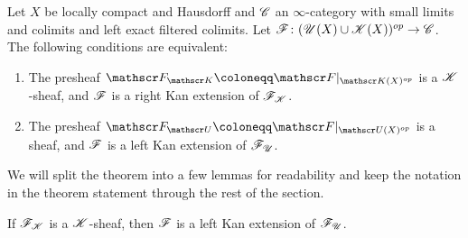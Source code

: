 \documentclass[../../thesis.tex]{subfiles}
\begin{document}
\begin{theorem}\label{7.3.4.9}
    Let $X$ be locally compact and Hausdorff and $\mathscr{C}$ an $\infty$-category  with small limits and colimits and left exact filtered colimits.
    Let $\mathscr{F} \colon (\mathscr{U}(X) \cup \mathscr{K}(X))^{op} \to \mathscr{C}$.
    The following conditions are equivalent:
    \begin{enumerate}[]
        \item The presheaf $\F_{\K}\coloneqq \F|_{\K(X)^{op}}$ is a $\mathscr{K}$-sheaf, and $\mathscr{F}$ is a right Kan extension of $\mathscr{F}_{\mathscr{K}}$.
        \item The presheaf $\F_{\Open}\coloneqq\F|_{\Open(X)^{op}}$ is a sheaf, and $\mathscr{F}$ is a left Kan extension of $\mathscr{F}_{\mathscr{U}}$.
    \end{enumerate}
\end{theorem}
We will split the theorem into a few lemmas for readability and keep the notation in the theorem statement through the rest of the section.
\begin{lemma}
    If $\mathscr{F}_{\mathscr{K}}$ is a $\mathscr{K}$-sheaf, then $\mathscr{F}$ is a left Kan extension of $\mathscr{F}_{\mathscr{U}}$.
\end{lemma}
\end{document}
